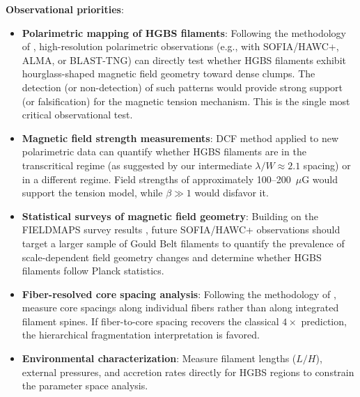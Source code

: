 \documentclass[11pt,a4paper]{article}
\begin{document}
\textbf{Observational priorities}:
\begin{itemize}
    \item \textbf{Polarimetric mapping of HGBS filaments}: Following the methodology of \citet{Jadhav2026}, high-resolution polarimetric observations (e.g., with SOFIA/HAWC+, ALMA, or BLAST-TNG) can directly test whether HGBS filaments exhibit hourglass-shaped magnetic field geometry toward dense clumps. The detection (or non-detection) of such patterns would provide strong support (or falsification) for the magnetic tension mechanism. This is the single most critical observational test.
    \item \textbf{Magnetic field strength measurements}: DCF method applied to new polarimetric data can quantify whether HGBS filaments are in the transcritical regime (as suggested by our intermediate $\lambda/W \approx 2.1$ spacing) or in a different regime. Field strengths of approximately 100--200~$\mu$G would support the tension model, while $\beta \gg 1$ would disfavor it.
    \item \textbf{Statistical surveys of magnetic field geometry}: Building on the FIELDMAPS survey results \citep{Coude2025}, future SOFIA/HAWC+ observations should target a larger sample of Gould Belt filaments to quantify the prevalence of scale-dependent field geometry changes and determine whether HGBS filaments follow Planck statistics.
    \item \textbf{Fiber-resolved core spacing analysis}: Following the methodology of \citet{Yang2024}, measure core spacings along individual fibers rather than along integrated filament spines. If fiber-to-core spacing recovers the classical $4\times$ prediction, the hierarchical fragmentation interpretation is favored.
    \item \textbf{Environmental characterization}: Measure filament lengths ($L/H$), external pressures, and accretion rates directly for HGBS regions to constrain the parameter space analysis.
\end{itemize}
\end{document}
